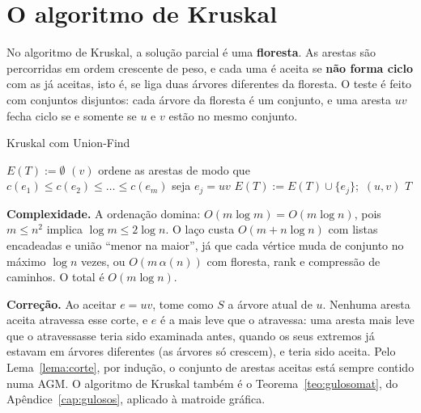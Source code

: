 \section{O algoritmo de Kruskal}\label{sec:kruskal}
No algoritmo de Kruskal, a solução parcial é uma \textbf{floresta}. As arestas são percorridas em ordem crescente de peso, e cada uma é aceita se \textbf{não forma ciclo} com as já aceitas, isto é, se liga duas árvores diferentes da floresta. O teste é feito com conjuntos disjuntos: cada árvore da floresta é um conjunto, e uma aresta $uv$ fecha ciclo se e somente se $u$ e $v$ estão no mesmo conjunto.
\begin{pseudo}{Kruskal com Union-Find}
\begin{algorithmic}
  \State $E(T):=\emptyset$
   \State \MakeSet$(v)$  \EndFor
  \State ordene as arestas de modo que $c(e_1)\le c(e_2)\le\dots\le c(e_m)$ 
    \State seja $e_j=uv$
     
      \State $E(T):=E(T)\cup\{e_j\}$;\ \Union$(u,v)$
    \EndIf
  \EndFor
  \State \Return $T$ 
\EndFunction
\end{algorithmic}
\end{pseudo}
\textbf{Complexidade.} A ordenação domina: $O(m\log m)=O(m\log n)$, pois $m\le n^2$ implica $\log m\le2\log n$. O laço custa $O(m+n\log n)$ com listas encadeadas e união ``menor na maior'', já que cada vértice muda de conjunto no máximo $\log n$ vezes, ou $O(m\,\alpha(n))$ com floresta, rank e compressão de caminhos. O total é $O(m\log n)$.

\textbf{Correção.} Ao aceitar $e=uv$, tome como $S$ a árvore atual de $u$. Nenhuma aresta aceita atravessa esse corte, e $e$ é a mais leve que o atravessa: uma aresta mais leve que o atravessasse teria sido examinada antes, quando os seus extremos já estavam em árvores diferentes (as árvores só crescem), e teria sido aceita. Pelo Lema~\ref{lema:corte}, por indução, o conjunto de arestas aceitas está sempre contido numa AGM. O algoritmo de Kruskal também é o Teorema~\ref{teo:gulosomat}, do Apêndice~\ref{cap:gulosos}, aplicado à matroide gráfica.

